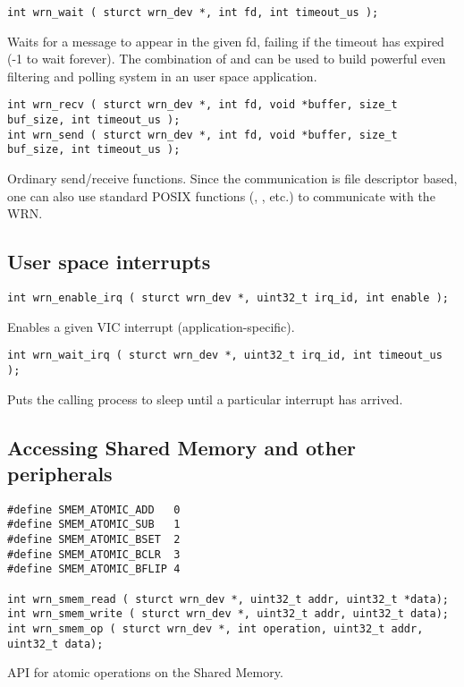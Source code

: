 \documentclass{article}
\begin{document}
\begin{verbatim}
int wrn_wait ( sturct wrn_dev *, int fd, int timeout_us );
\end{verbatim}
Waits for a message to appear in the given fd, failing if the timeout has expired (-1 to wait forever). The combination of  and  can be used to build powerful even filtering and polling system in an user space application.

\begin{verbatim}
int wrn_recv ( sturct wrn_dev *, int fd, void *buffer, size_t buf_size, int timeout_us );
int wrn_send ( sturct wrn_dev *, int fd, void *buffer, size_t buf_size, int timeout_us );
\end{verbatim}
Ordinary send/receive functions. Since the communication is file descriptor based, one can also
use standard POSIX functions (, , etc.) to communicate with the WRN.

\subsection{User space interrupts}

\begin{verbatim}
int wrn_enable_irq ( sturct wrn_dev *, uint32_t irq_id, int enable );
\end{verbatim}
Enables a given VIC interrupt (application-specific).

\begin{verbatim}
int wrn_wait_irq ( sturct wrn_dev *, uint32_t irq_id, int timeout_us );
\end{verbatim}
Puts the calling process to sleep until a particular interrupt has arrived. 

\subsection{Accessing Shared Memory and other peripherals}

\begin{verbatim}
#define SMEM_ATOMIC_ADD   0
#define SMEM_ATOMIC_SUB   1
#define SMEM_ATOMIC_BSET  2
#define SMEM_ATOMIC_BCLR  3
#define SMEM_ATOMIC_BFLIP 4

int wrn_smem_read ( sturct wrn_dev *, uint32_t addr, uint32_t *data);
int wrn_smem_write ( sturct wrn_dev *, uint32_t addr, uint32_t data);
int wrn_smem_op ( sturct wrn_dev *, int operation, uint32_t addr, uint32_t data);
\end{verbatim}
API for atomic operations on the Shared Memory.
\end{document}
